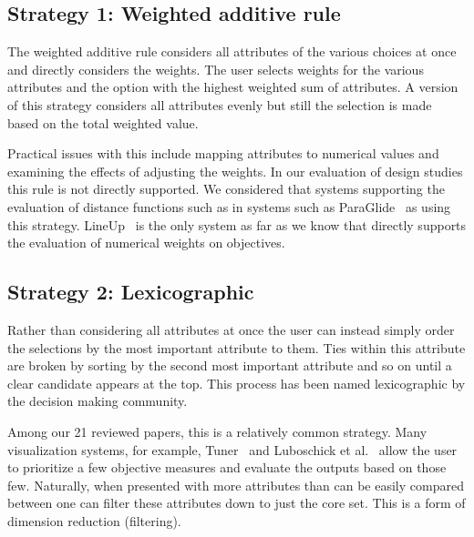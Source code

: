 
\subsection{Strategy 1: Weighted additive rule}\label{weighted-additive-rule}

The weighted additive rule considers all
attributes of the various choices at once and directly considers 
the weights. The user selects weights for the various attributes and 
the option with the highest weighted sum of attributes.
A version of this strategy considers all attributes evenly but still
the selection is made based on the total weighted value.

Practical issues with this include mapping attributes to numerical values
and examining the effects of adjusting the weights. In our evaluation of
design studies this rule is not directly supported. We considered that
systems supporting the evaluation of distance functions such as 
in systems such as ParaGlide~\citep{Bergner:2013} as using this strategy.
LineUp~\citep{Gratzl:2013} is the only system as far as we know that
directly supports the evaluation of numerical weights on objectives. 

\subsection{Strategy 2: Lexicographic}\label{lexicographic}

Rather than considering all attributes at once the user can instead simply
order the selections by the most important attribute to them. Ties within this
attribute are broken by sorting by the second most important attribute and so
on until a clear candidate appears at the top. This process has been named
lexicographic by the decision making community.

Among our 21 reviewed papers, this is a relatively common strategy.
Many visualization systems, for example, Tuner~\cite{Torsney-Weir:2011} and
Luboschick et al.~\citep{Luboschik:2014} allow the user to prioritize a few
objective measures and evaluate the outputs based on those few. Naturally,
when presented with more attributes than can be easily compared between
one can filter
these attributes down to just the core set. This is a form of dimension 
reduction (filtering).

